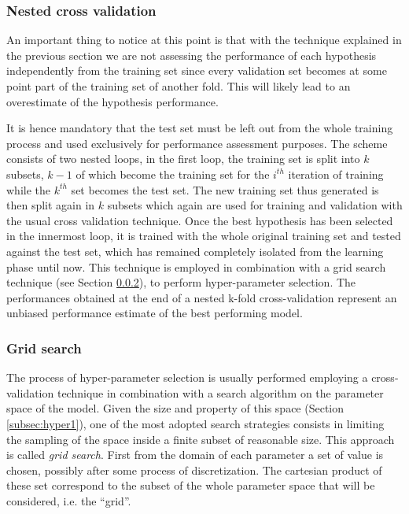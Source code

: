 \subsubsection{Nested cross validation}
\label{subsubsec:ncv}
An important thing to notice at this point is that with the technique explained in
the previous section we are not assessing the performance of each hypothesis
independently from the training set since every validation set becomes at some
point part of the training set of another fold.
This will likely lead to an overestimate of the hypothesis performance.

It is hence mandatory that the test set must be left out from the whole training
process and used exclusively for performance assessment purposes.
The scheme consists of two nested loops, in the first loop, the training set
is split into $k$ subsets, $k-1$ of which become the training set for the
$i^{th}$ iteration of training while the $k^{th}$ set becomes the test set.
The new training set thus generated is then split again in $k$ subsets
which again are used for training and validation with the usual cross validation
technique.
Once the best hypothesis has been selected in the innermost loop, it is trained
with the whole original training set and tested against the test set, which has
remained completely isolated from the learning phase until now.
This technique is employed in combination with a grid search technique (see Section
\ref{subsubsec:grid}), to perform hyper-parameter selection.
The performances obtained at the end of a nested k-fold cross-validation represent
an unbiased performance estimate of the best performing model.

\subsubsection{Grid search}
\label{subsubsec:grid}
The process of hyper-parameter selection is usually performed employing a cross-validation
technique in combination with a search algorithm on the parameter space of the model.
Given the size and property of this space (Section \ref{subsec:hyper1}), one of the
most adopted search strategies consists in limiting the sampling of the space inside
a finite subset of reasonable size.
This approach is called \emph{grid search}. First from the domain of each parameter a 
set of value is chosen, possibly after some process of discretization.
The cartesian product of these set correspond to the subset of the whole parameter
space that will be considered, i.e. the ``grid''.

